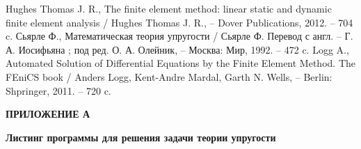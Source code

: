 \documentclass[a4paper, 14pt]{extreport}
\begin{document}
\newpage
{}
\renewcommand{\bibname}{\Large{СПИСОК ИСПОЛЬЗОВАННЫХ ИСТОЧНИКОВ}}
\begin{thebibliography}{9}

			Hughes Thomas J. R.,
			{The finite element method: linear static and dynamic finite element analysis} /
			Hughes Thomas J. R., -- Dover Publications, 2012. -- 704 c.
			Сьярле Ф.,
			{Математическая теория упругости} /
			Сьярле Ф. Перевод с англ. -- Г. А. Иосифьяна ; под ред. О. А. Олейник, -- Москва: Мир, 1992. -- 472 c.
			Logg A.,
			{Automated Solution of Differential Equations by the Finite Element Method. The FEniCS book} /
			Anders Logg, Kent-Andre Mardal, Garth N. Wells, -- Berlin: Shpringer, 2011. -- 720 c.
\end{thebibliography}



\newpage
{}
\begin{center}
	\begin{flushright}
		\Large{\textbf{ПРИЛОЖЕНИЕ А}}\\
	\end{flushright}
	\textbf{Листинг программы для решения задачи теории упругости}
\end{center}




\end{document}
